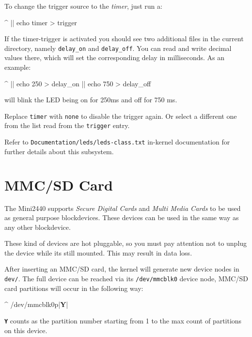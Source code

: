 To change the trigger source to the \textit{timer}, just run a:

\begin{ptxshell}[escapechar=|]{^}
|\LedPath| echo timer > trigger
\end{ptxshell}

If the timer-trigger is activated you should see two additional files in the
current directory, namely \texttt{delay\_on} and \texttt{delay\_off}. You can
read and write decimal values there, which will set the corresponding delay in
milliseconds. As an example:

\begin{ptxshell}[escapechar=|]{^}
|\LedPath| echo 250 > delay_on
|\LedPath| echo 750 > delay_off
\end{ptxshell}

will blink the LED being on for 250ms and off for 750 ms.

Replace \texttt{timer} with \texttt{none} to disable the trigger again. Or
select a different one from the list read from the \texttt{trigger} entry.

Refer to \texttt{Documentation/leds/leds-class.txt} in-kernel documentation for
further details about this subsystem.


\section{MMC/SD Card}					\label{sec:SDC}

The Mini2440 supports \textit{Secure Digital Cards} and
\textit{Multi Media Cards} to be used as general purpose blockdevices. These
devices can be used in the same way as any other blockdevice.

\begin{important}
These kind of devices are hot pluggable, so you must pay attention not to
unplug the device while its still mounted. This may result in data loss.
\end{important}

After inserting an MMC/SD card, the kernel will generate new device nodes in
\texttt{dev/}. The full device can be reached via its \texttt{/dev/mmcblk0}
device node, MMC/SD card partitions will occur in the following way:

\begin{ptxshell}[escapechar=|]{^}
/dev/mmcblk0p|\textbf{Y}|
\end{ptxshell}
\texttt{\textbf{Y}} counts as the partition number starting from 1 to the max
count of partitions on this device.

